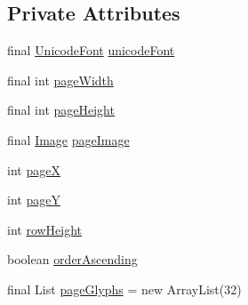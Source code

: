 \subsection*{Private Attributes}
\begin{DoxyCompactItemize}
\item 
final \mbox{\hyperlink{classorg_1_1newdawn_1_1slick_1_1_unicode_font}{Unicode\+Font}} \mbox{\hyperlink{classorg_1_1newdawn_1_1slick_1_1font_1_1_glyph_page_a24df618c9e902dd841e708d572559641}{unicode\+Font}}
\item 
final int \mbox{\hyperlink{classorg_1_1newdawn_1_1slick_1_1font_1_1_glyph_page_a92a417a19c115ae906499f7d8c026130}{page\+Width}}
\item 
final int \mbox{\hyperlink{classorg_1_1newdawn_1_1slick_1_1font_1_1_glyph_page_a87d58eab40df58d9ad0d1cd5f2d0db3b}{page\+Height}}
\item 
final \mbox{\hyperlink{classorg_1_1newdawn_1_1slick_1_1_image}{Image}} \mbox{\hyperlink{classorg_1_1newdawn_1_1slick_1_1font_1_1_glyph_page_a9ca6f69c7df1769fe54cbd6a13f46645}{page\+Image}}
\item 
int \mbox{\hyperlink{classorg_1_1newdawn_1_1slick_1_1font_1_1_glyph_page_a6d1de13b49bd950e136d250a37eee4eb}{pageX}}
\item 
int \mbox{\hyperlink{classorg_1_1newdawn_1_1slick_1_1font_1_1_glyph_page_a94b7aa9b91e5227a58e8f416ffe0fbaa}{pageY}}
\item 
int \mbox{\hyperlink{classorg_1_1newdawn_1_1slick_1_1font_1_1_glyph_page_a98ef737403aa53fed93e68e08117ec39}{row\+Height}}
\item 
boolean \mbox{\hyperlink{classorg_1_1newdawn_1_1slick_1_1font_1_1_glyph_page_a2503df17a682f59d93a93acb3182075b}{order\+Ascending}}
\item 
final List \mbox{\hyperlink{classorg_1_1newdawn_1_1slick_1_1font_1_1_glyph_page_a9e91d415e3d3b45f8e9ffaa687701bb4}{page\+Glyphs}} = new Array\+List(32)
\end{DoxyCompactItemize}
